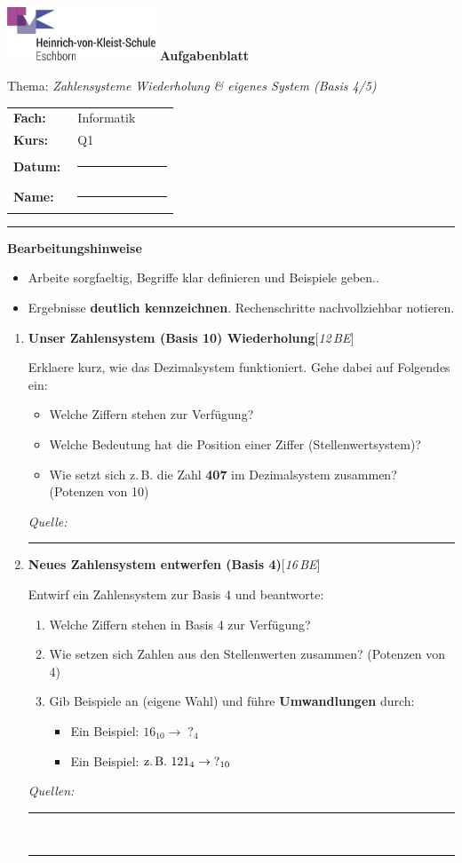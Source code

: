 \documentclass[11pt,a4paper]{scrartcl}
\newcommand{\blatttyp}{Aufgabenblatt}
\newcommand{\thema}{\textit{Zahlensysteme \textemdash Wiederholung \& eigenes System (Basis 4/5)}}
\newcommand{\sheettitle}[2]{%
	\begin{minipage}[t]{0.62\linewidth}
		\includegraphics[height=1.6cm]{hvk-logo.png} %
		\vspace{0.6em}
		{\Large\bfseries #1}\par\vspace{-0.2em}
		{\normalsize #2}
	\end{minipage}\hfill
	\begin{minipage}[t]{0.35\linewidth}
		\renewcommand{\arraystretch}{1.2}
		\begin{tabular}{>{\bfseries}p{0.36\linewidth}p{0.58\linewidth}}
			Fach: & Informatik \\
			Kurs: & Q1 \\
			Datum: & \rule{3.8cm}{0.4pt} \\
			Name: & \rule{3.8cm}{0.4pt} \\
		\end{tabular}
	\end{minipage}
	\vspace{0.8em}\par\hrule\vspace{1.0em}
}
\newenvironment{aufgaben}{%
	\begin{enumerate}[leftmargin=*,label=\textbf{Aufgabe~\arabic*:}]}
	{\end{enumerate}}
\newcommand{\punkte}[1]{\hfill{\small[\textit{#1\,BE}]}}
\newenvironment{hinweise}{%
	\vspace{0.2em}\textbf{Bearbeitungshinweise}\par
	\begin{itemize}[leftmargin=*,topsep=0.3em,itemsep=0.2em]}
	{\end{itemize}\vspace{0.5em}}
\begin{document}
	
	\sheettitle{\blatttyp}{Thema: \thema}
	
	\begin{hinweise}
		\item Arbeite sorgfaeltig, Begriffe klar definieren und Beispiele geben..
		\item Ergebnisse \textbf{deutlich kennzeichnen}. Rechenschritte nachvollziehbar notieren.
	\end{hinweise}
	
	\begin{aufgaben}
		
		\item \textbf{Unser Zahlensystem (Basis 10) \textemdash Wiederholung}\punkte{12}
		
		Erklaere kurz, wie das Dezimalsystem funktioniert. Gehe dabei auf Folgendes ein:
		\begin{itemize}[leftmargin=*]
			\item Welche Ziffern stehen zur Verfügung?
			\item Welche Bedeutung hat die Position einer Ziffer (Stellenwertsystem)?
			\item Wie setzt sich z.\,B. die Zahl \textbf{407} im Dezimalsystem zusammen? (Potenzen von 10)
		\end{itemize}
		\textit{Quelle:} \rule{11cm}{0.4pt}
		
		\vspace{0.4cm}
		
		\item \textbf{Neues Zahlensystem entwerfen (Basis 4)}\punkte{16}
		
		Entwirf ein Zahlensystem zur Basis 4 und beantworte:
		\begin{enumerate}[label=\alph*)]
			\item Welche Ziffern stehen in Basis 4 zur Verfügung?
			\item Wie setzen sich Zahlen aus den Stellenwerten zusammen? (Potenzen von 4)
			\item Gib Beispiele an (eigene Wahl) und führe \textbf{Umwandlungen} durch:
			\begin{itemize}
				\item Ein Beispiel: \(16_{10} \to \;?_{4}\)
				\item Ein Beispiel: \(\text{z.\,B. }121_{4} \to \;?_{10}\)
			\end{itemize}
		\end{enumerate}
		\textit{Quellen:} \rule{5cm}{0.4pt}\ \rule{5cm}{0.4pt}
		
		\vspace{0.2cm}
		

\end{aufgaben}
\end{document}
